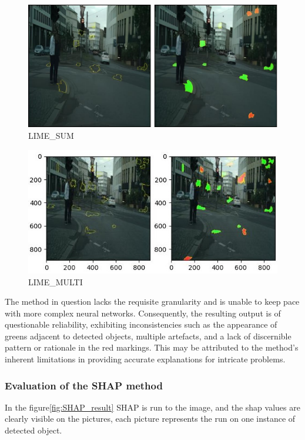 \begin{figure}[h]
    \centering
    \includegraphics[width=\textwidth]{figures/best-box_bonn_000035_000019_leftImg8bit}
    \caption{LIME\_SUM}
    \label{fig:LIME1}
\end{figure}
\hfill
\begin{figure}[h]
    \centering
    \includegraphics[width=\textwidth]{figures/best-box_bonn_000035_000019_leftImg8bit_MULTI}
    \caption{LIME\_MULTI}
    \label{fig:LIME2}
\end{figure}

The method in question lacks the requisite granularity and is unable to keep pace with more complex neural networks.
Consequently, the resulting output is of questionable reliability, exhibiting inconsistencies such as the appearance of greens adjacent to detected objects, multiple artefacts, and a lack of discernible pattern or rationale in the red markings.
This may be attributed to the method's inherent limitations in providing accurate explanations for intricate problems.

\subsubsection{Evaluation of the SHAP method}\label{subsubsec:evaluation-of-the-shap-method}
In the figure\ref{fig:SHAP_result} SHAP is run to the image, and the shap values are clearly visible on the pictures, each picture represents the run on one instance of detected object.


